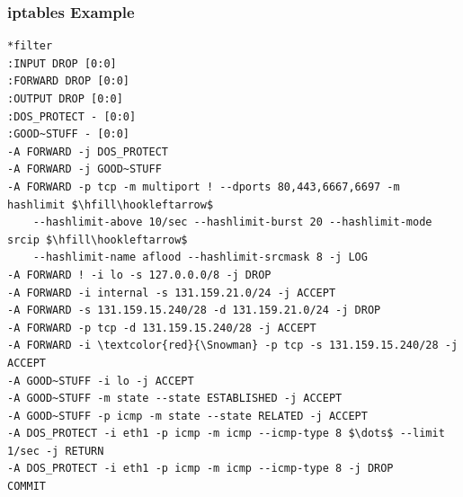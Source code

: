 \documentclass[aspectratio=169]{beamer}
\begin{document}
\begin{frame}[fragile]
	\frametitle{iptables Example}
	
\begin{minipage}{\linewidth}
\footnotesize
\begin{Verbatim}[commandchars=\\\{\},codes={\catcode`$=3\catcode`^=7}]
*filter
:INPUT DROP [0:0]
:FORWARD DROP [0:0]
:OUTPUT DROP [0:0]
:DOS_PROTECT - [0:0]
:GOOD~STUFF - [0:0]
-A FORWARD -j DOS_PROTECT
-A FORWARD -j GOOD~STUFF
-A FORWARD -p tcp -m multiport ! --dports 80,443,6667,6697 -m hashlimit $\hfill\hookleftarrow$
    --hashlimit-above 10/sec --hashlimit-burst 20 --hashlimit-mode srcip $\hfill\hookleftarrow$
    --hashlimit-name aflood --hashlimit-srcmask 8 -j LOG
-A FORWARD ! -i lo -s 127.0.0.0/8 -j DROP
-A FORWARD -i internal -s 131.159.21.0/24 -j ACCEPT
-A FORWARD -s 131.159.15.240/28 -d 131.159.21.0/24 -j DROP
-A FORWARD -p tcp -d 131.159.15.240/28 -j ACCEPT
-A FORWARD -i \textcolor{red}{\Snowman} -p tcp -s 131.159.15.240/28 -j ACCEPT
-A GOOD~STUFF -i lo -j ACCEPT
-A GOOD~STUFF -m state --state ESTABLISHED -j ACCEPT
-A GOOD~STUFF -p icmp -m state --state RELATED -j ACCEPT
-A DOS_PROTECT -i eth1 -p icmp -m icmp --icmp-type 8 $\dots$ --limit 1/sec -j RETURN
-A DOS_PROTECT -i eth1 -p icmp -m icmp --icmp-type 8 -j DROP
COMMIT
\end{Verbatim}
\end{minipage}%

\end{frame}
\end{document}
